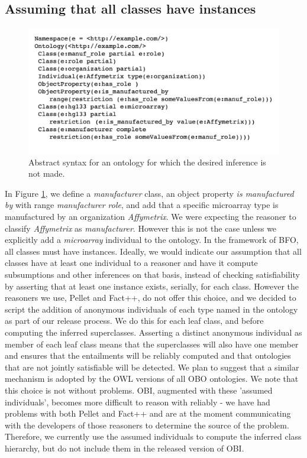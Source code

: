 \documentclass{elsart}       %
\begin{document}
\subsection{Assuming that all classes have instances}

\begin{figure}[t]
\centering \includegraphics*[width=1\columnwidth]{inference}
\caption{Abstract syntax for an ontology for which the desired inference is not made.}
\label{fig:instances}
\end{figure}

In Figure \ref{fig:instances}, we define a \emph{manufacturer} class, an object property \emph{is manufactured by} with range \emph{manufacturer role}, and add that a specific microarray type is manufactured by an organization \emph{Affymetrix}.
We were expecting the reasoner to classify \emph{Affymetrix} as \emph{manufacturer}.
However this is not the case unless we explicitly add a \emph{microarray} individual to the ontology.
In the framework of BFO, all classes must have instances.
Ideally, we would indicate our assumption that all classes have at least one individual to a reasoner and have it compute subsumptions and other inferences on that basis, instead of checking satisfiability by asserting that at least one instance exists, serially, for each class.
However the reasoners we use, Pellet\cite{pellet} and Fact++\cite{fact}, do not offer this choice, and we decided to script the addition of anonymous individuals of each type named in the ontology as part of our release process.
We do this for each leaf class, and before computing the inferred superclasses.
Asserting a distinct anonymous individual as member of each leaf class means that the superclasses will also have one member and ensures that the entailments will be reliably computed and that ontologies that are not jointly satisfiable will be detected.
We plan to suggest that a similar mechanism is adopted by the OWL versions of all OBO ontologies.
We note that this choice is not without problems.
OBI, augmented with these 'assumed individuals', becomes more difficult to reason with reliably - we have had problems with both Pellet and Fact++ and are at the moment communicating with the developers of those reasoners to determine the source of the problem.
Therefore, we currently use the assumed individuals to compute the inferred class hierarchy, but do not include them in the released version of OBI.
\end{document}
